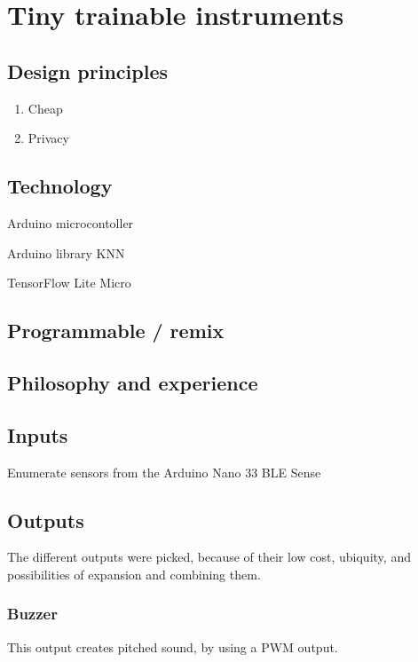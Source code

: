 \chapter{Tiny trainable instruments}

\section{Design principles}

\begin{enumerate}
  \item Cheap
  \item Privacy
\end{enumerate}

\section{Technology}

Arduino microcontoller

Arduino library KNN

TensorFlow Lite Micro

\section{Programmable / remix}

\section{Philosophy and experience}

\section{Inputs}

Enumerate sensors from the Arduino Nano 33 BLE Sense

\section{Outputs}

The different outputs were picked, because of their low cost, ubiquity, and possibilities of expansion and combining them.

\subsection{Buzzer}

This output creates pitched sound, by using a PWM output.

